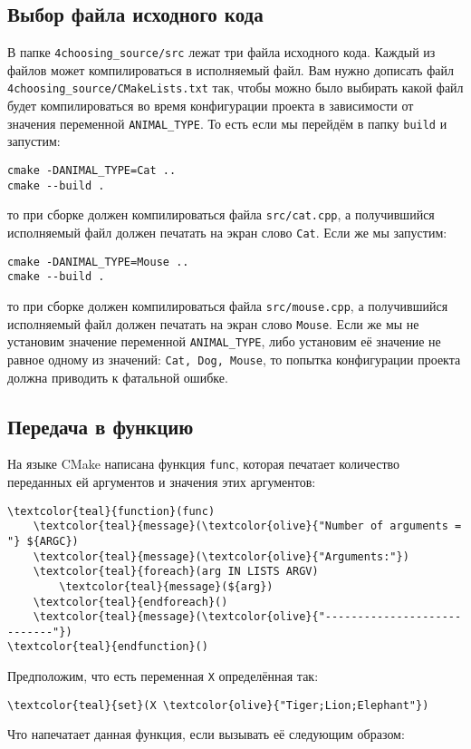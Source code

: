 \documentclass{article}
\begin{document}
\subsection{Выбор файла исходного кода}
В папке \texttt{4choosing\_source/src} лежат три файла исходного кода. Каждый из файлов может компилироваться в исполняемый файл. Вам нужно дописать файл \texttt{4choosing\_source/CMakeLists.txt} так, чтобы можно было выбирать какой файл будет компилироваться во время конфигурации проекта в зависимости от значения переменной \texttt{ANIMAL\_TYPE}. То есть если мы перейдём в папку \texttt{build} и запустим:
\begin{verbatim}
cmake -DANIMAL_TYPE=Cat ..
cmake --build .
\end{verbatim}
то при сборке должен компилироваться файла \texttt{src/cat.cpp}, а получившийся исполняемый файл должен печатать на экран слово \texttt{Cat}.
Если же мы запустим:
\begin{verbatim}
cmake -DANIMAL_TYPE=Mouse ..
cmake --build .
\end{verbatim}
то при сборке должен компилироваться файла \texttt{src/mouse.cpp}, а получившийся исполняемый файл должен печатать на экран слово \texttt{Mouse}.
Если же мы не установим значение переменной \texttt{ANIMAL\_TYPE}, либо установим её значение не равное одному из значений: \texttt{Cat, Dog, Mouse}, то попытка конфигурации проекта должна приводить к фатальной ошибке.



\subsection{Передача в функцию}
На языке CMake написана функция \texttt{func}, которая печатает количество переданных ей аргументов и значения этих аргументов:
\begin{Verbatim}[commandchars=\\\{\}]
\textcolor{teal}{function}(func)
    \textcolor{teal}{message}(\textcolor{olive}{"Number of arguments = "} ${ARGC})
    \textcolor{teal}{message}(\textcolor{olive}{"Arguments:"})
    \textcolor{teal}{foreach}(arg IN LISTS ARGV)
        \textcolor{teal}{message}(${arg})
    \textcolor{teal}{endforeach}()
    \textcolor{teal}{message}(\textcolor{olive}{"----------------------------"})
\textcolor{teal}{endfunction}()
\end{Verbatim}

Предположим, что есть переменная \texttt{X} определённая так:
\begin{Verbatim}[commandchars=\\\{\}]
\textcolor{teal}{set}(X \textcolor{olive}{"Tiger;Lion;Elephant"})
\end{Verbatim}
Что напечатает данная функция, если вызывать её следующим образом:
\end{document}
